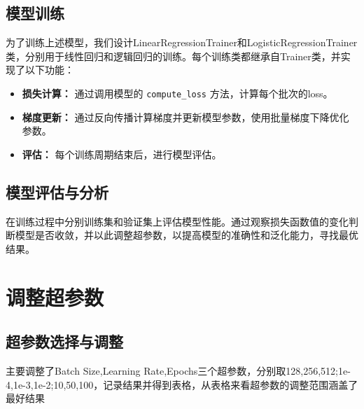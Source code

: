 \documentclass[12pt]{article}
\begin{document}
\subsection{模型训练}

为了训练上述模型，我们设计LinearRegressionTrainer和LogisticRegressionTrainer类，分别用于线性回归和逻辑回归的训练。每个训练类都继承自Trainer类，并实现了以下功能：

\begin{itemize}
    \item \textbf{损失计算：} 通过调用模型的 \texttt{compute\_loss} 方法，计算每个批次的loss。
    \item \textbf{梯度更新：} 通过反向传播计算梯度并更新模型参数，使用批量梯度下降优化参数。
    \item \textbf{评估：} 每个训练周期结束后，进行模型评估。
\end{itemize}

\subsection{模型评估与分析}

在训练过程中分别训练集和验证集上评估模型性能。通过观察损失函数值的变化判断模型是否收敛，并以此调整超参数，以提高模型的准确性和泛化能力，寻找最优结果。


\section{调整超参数}

\subsection{超参数选择与调整}
主要调整了Batch Size,Learning Rate,Epochs三个超参数，分别取128,256,512;1e-4,1e-3,1e-2;10,50,100，记录结果并得到表格，从表格来看超参数的调整范围涵盖了最好结果  
\end{document}
